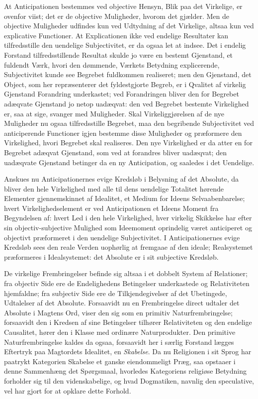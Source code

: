 \documentclass[12pt]{book}
\newcommand{\opage}[1]{\marginnote{\footnotesize\textit{[#1]}}}
\begin{document}
At Anticipationen bestemmes ved objective Hensyn, Blik
paa det Virkelige, er ovenfor viist; det er de objective Muligheder,
hvorom det gjælder. Men de objective Muligheder
udfindes kun ved Udtydning af det Virkelige, altsaa kun ved
explicative Functioner. At Explicationen ikke ved endelige
Resultater kan tilfredsstille den uendelige Subjectivitet, er da
ogsaa let at indsee. Det i endelig Forstand tilfredsstillende
Resultat skulde jo være en bestemt Gjenstand, et fuldendt
Værk, hvori den dømmende, Værkets Betydning explicerende,
Subjectivitet kunde see Begrebet fuldkommen realiseret; men
den Gjenstand, det Object, som her repræsenterer det fyldestgjorte
Begreb, er i Qvalitet af virkelig Gjenstand Forandring
\opage{149}underkastet; ved Forandringen bliver den for Begrebet adæqvate
Gjenstand jo netop uadæqvat: den ved Begrebet bestemte
Virkelighed er, saa at sige, svanger med Muligheder.
Skal Virkeliggjørelsen af de nye Muligheder nu ogsaa tilfredsstille
Begrebet, maa den begribende Subjectivitet ved
anticiperende Functioner igjen bestemme disse Muligheder og
præformere den Virkelighed, hvori Begrebet skal realiseres.
Den nye Virkelighed er da atter en for Begrebet adæqvat
Gjenstand, som ved at forandres bliver uadæqvat; den uadæqvate
Gjenstand betinger da en ny Anticipation, og saaledes
i det Uendelige.

Anskues nu Anticipationernes evige Kredsløb i Belysning
af det Absolute, da bliver den hele Virkelighed med alle
til dens uendelige Totalitet hørende Elementer gjennemskinnet
af Idealitet, et Medium for Ideens Selvaabenbarelse; hvert
Virkelighedselement er ved Anticipationen et Ideens Moment
fra Begyndelsen af: hvert Led i den hele Virkelighed, hver
virkelig Skikkelse har efter sin objectiv-subjective Mulighed
som Ideemoment oprindelig været anticiperet og objectivt
præformeret i den uendelige Subjectivitet. I Anticipationernes
evige Kredsløb sees den reale Verden uophørlig at fremgaae
af den ideale; Realsystemet præformeres i Idealsystemet: det
Absolute er i sit subjective Kredsløb.

De virkelige Frembringelser befinde sig altsaa i et dobbelt
System af Relationer; fra objectiv Side ere de Endelighedens
Betingelser underkastede og Relativiteten hjemfaldne;
fra subjectiv Side ere de Tilkjendegivelser af det Ubetingede,
Udtalelser af det Absolute. Forsaavidt nu en Frembringelse
direct udtaler det Absolute i Magtens Ord, viser den sig som
en primitiv Naturfrembringelse; forsaavidt den i Kredsen af
sine Betingelser tilhører Relativiteten og den endelige Causalitet,
hører den i Klasse med ordinære Naturprodukter. Den
primitive Naturfrembringelse kaldes da ogsaa, forsaavidt her i
særlig Forstand lægges Eftertryk paa Magtordets Idealitet,
\opage{150}en \emph{Skabelse}. Da nu Religionen i sit Sprog har paatrykt
Kategorien Skabelse et ganske eiendommeligt Præg, saa
opstaaer i denne Sammenhæng det Spørgsmaal, hvorledes
Kategoriens religiøse Betydning forholder sig til den videnskabelige,
og hvad Dogmatiken, navnlig den speculative, vel
har gjort for at opklare dette Forhold.
\end{document}
